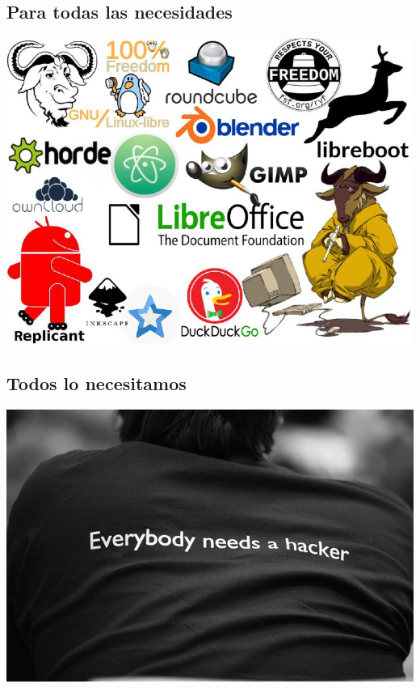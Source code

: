 \subsection{Para todas las necesidades}
\begin{frame}
        \includegraphics[width=\textwidth]{free-sw.jpg}
\end{frame}

\subsection{Todos lo necesitamos}
\begin{frame}
        \includegraphics[width=\textwidth]{EverybodyNeedsAHacker.jpg}
\end{frame}